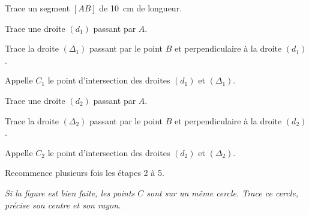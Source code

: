 \begin{myenumerate}
  \item Trace un segment $[AB]$ de 10~cm de longueur.
  \item Trace une droite $(d_1)$ passant par $A$.
  \item Trace la droite $(\Delta_1)$ passant par le point $B$ et perpendiculaire à la droite $(d_1)$.
  \item Appelle $C_1$ le point d'intersection des droites $(d_1)$ et $(\Delta_1)$.
  \item Trace une droite $(d_2)$ passant par $A$.
  \item Trace la droite $(\Delta_2)$ passant par le point $B$ et perpendiculaire à la droite $(d_2)$.
  \item Appelle $C_2$ le point d'intersection des droites $(d_2)$ et $(\Delta_2)$.
  \item Recommence plusieurs fois les étapes 2 à 5.
\end{myenumerate}
{\em Si la figure est bien faite, les points $C$ sont sur un même cercle. Trace ce cercle, précise son centre et son rayon.}